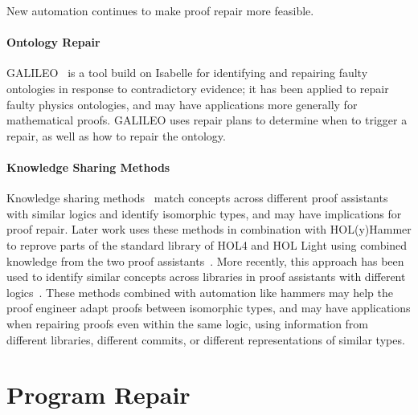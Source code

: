 New automation continues to make proof repair more feasible.

\paragraph{Ontology Repair}
GALILEO~\cite{chan2011galileo} is a tool build on Isabelle for identifying and repairing faulty ontologies in response to contradictory
evidence; it has been applied to repair faulty physics ontologies, and may have applications more generally for mathematical proofs.
GALILEO uses repair plans to determine when to trigger a repair, as well as how to repair the ontology.

\paragraph{Knowledge Sharing Methods}
Knowledge sharing methods~\cite{gauthier2014} match concepts across
different proof assistants with similar logics and identify isomorphic types,
and may have implications for proof repair.
Later work uses these methods in combination with HOL(y)Hammer to
reprove parts of the standard library of HOL4 and HOL Light using combined knowledge 
from the two proof assistants~\cite{Gauthier2015}. 
More recently, this approach has been used to identify similar concepts
across libraries in proof assistants with different logics~\cite{gauthier2017}.
These methods combined with automation like hammers may help the proof engineer 
adapt proofs between isomorphic types, and may have applications
when repairing proofs even within the same logic, using information from different 
libraries, different commits, or different representations of similar types.


\section{Program Repair}
\label{sec:repair}

